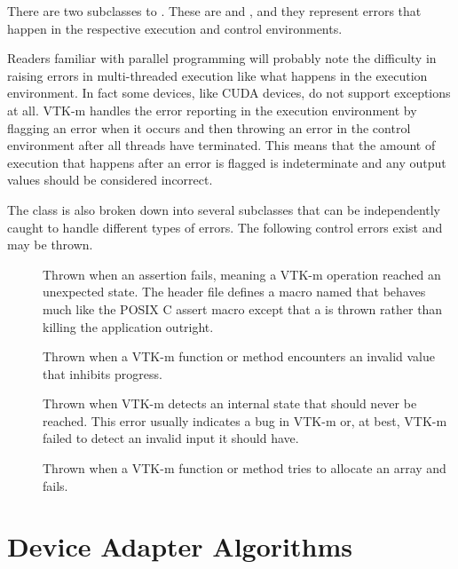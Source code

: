 
There are two subclasses to . These are
 and , and they represent
errors that happen in the respective execution and control environments.

Readers familiar with parallel programming will probably note the
difficulty in raising errors in multi-threaded execution like what happens
in the execution environment. In fact some devices, like CUDA devices, do
not support exceptions at all. VTK-m handles the error reporting in the
execution environment by flagging an error when it occurs and then throwing
an error in the control environment after all threads have terminated. This
means that the amount of execution that happens after an error is flagged
is indeterminate and any output values should be considered incorrect.

The  class is also broken down into several
subclasses that can be independently caught to handle different types of
errors. The following control errors exist and may be thrown.
\begin{description}
\item[]  
  Thrown when an assertion fails, meaning a VTK-m operation reached an
  unexpected state. The header file 
  defines a macro named  that behaves much
  like the POSIX C assert macro except that a
   is thrown rather than killing the
  application outright.
\item[] Thrown when a VTK-m function or
  method encounters an invalid value that inhibits progress.
\item[] Thrown when VTK-m detects an
  internal state that should never be reached. This error usually indicates
  a bug in VTK-m or, at best, VTK-m failed to detect an invalid input it
  should have.
\item[] Thrown when a VTK-m function or
  method tries to allocate an array and fails.
\end{description}



\section{Device Adapter Algorithms}
\label{sec:DeviceAdapterAlgorithms}

